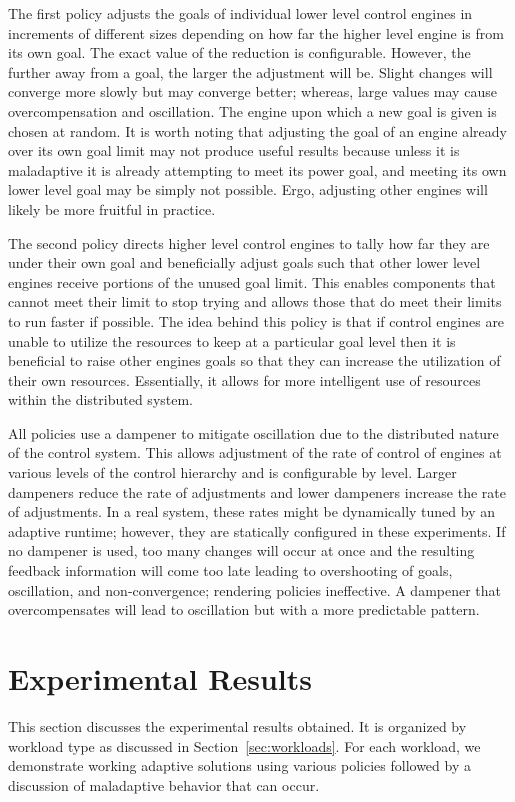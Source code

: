         The first policy adjusts the goals of individual lower level control engines in increments of different sizes depending on how far the higher level engine is from its own goal. The exact value of the reduction is configurable. However, the further away from a goal, the larger the adjustment will be. Slight changes will converge more slowly but may converge better; whereas, large values may cause overcompensation and oscillation. The engine upon which a new goal is given is chosen at random. It is worth noting that adjusting the goal of an engine already over its own goal limit may not produce useful results because unless it is maladaptive it is already attempting to meet its power goal, and meeting its own lower level goal may be simply not possible. Ergo, adjusting other engines will likely be more fruitful in practice.
        
        The second policy directs higher level control engines to tally how far they are under their own goal and beneficially adjust goals such that other lower level engines receive portions of the unused goal limit.  This enables components that cannot meet their limit to stop trying and allows those that do meet their limits to run faster if possible. The idea behind this policy is that if control engines are unable to utilize the resources to keep at a particular goal level then it is beneficial to raise other engines goals so that they can increase the utilization of their own resources. Essentially, it allows for more intelligent use of resources within the distributed system.

        All policies use a dampener to mitigate oscillation due to the distributed nature of the control system. This allows adjustment of the rate of control of engines at various levels of the control hierarchy and is configurable by level. Larger dampeners reduce the rate of adjustments and lower dampeners increase the rate of adjustments. In a real system, these rates might be dynamically tuned by an adaptive runtime; however, they are statically configured in these experiments. If no dampener is used, too many changes will occur at once and the resulting feedback information will come too late leading to overshooting of goals, oscillation, and non-convergence; rendering policies ineffective. A dampener that overcompensates will lead to oscillation but with a more predictable pattern.
\section{Experimental Results}
    This section discusses the experimental results obtained. It is organized by workload type as discussed in Section~\ref{sec:workloads}. For each workload, we demonstrate working adaptive solutions using various policies followed by a discussion of maladaptive behavior that can occur.

